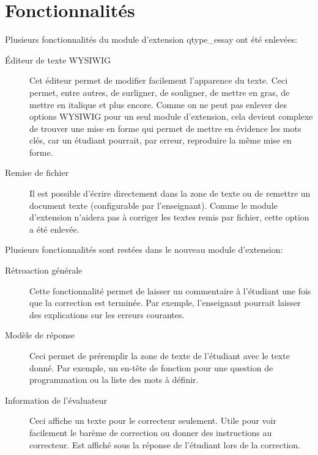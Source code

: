 \section{Fonctionnalités}

Plusieurs fonctionnalités du module d'extension \og qtype\_essay \fg{} ont été enlevées:

\begin{description}
  \item[Éditeur de texte WYSIWIG]
  
  Cet \'editeur permet de modifier facilement l'apparence du texte.
  Ceci permet, entre autres, de surligner, de souligner, de mettre en gras, de mettre en italique et plus encore.
  Comme on ne peut pas enlever des options WYSIWIG pour un seul module d'extension, cela devient complexe de trouver une mise en forme qui permet de mettre en évidence les mots clés, car un étudiant pourrait, par erreur, reproduire la même mise en forme.
  
  \item[Remise de fichier]
  
  Il est possible d'écrire directement dans la zone de texte ou de remettre un document texte (configurable par l'enseignant).
  Comme le module d'extension n'aidera pas à corriger les textes remis par fichier, cette option a été enlevée.
\end{description}

Plusieurs fonctionnalités sont restées dans le nouveau module d'extension:

\begin{description}
  \item[Rétroaction générale]
  
  Cette fonctionnalit\'e permet de laisser un commentaire à l'étudiant une fois que la correction est termin\'ee.
  Par exemple, l'enseignant pourrait laisser des explications sur les erreurs courantes.
  
  \item[Modèle de réponse]
  
  Ceci permet de préremplir la zone de texte de l'étudiant avec le texte donné.
  Par exemple, un en-tête de fonction pour une question de programmation ou la liste des mots à définir.
  
  \item[Information de l'évaluateur]
  
  Ceci affiche un texte pour le correcteur seulement.
  Utile pour voir facilement le barème de correction ou donner des instructions au correcteur.
  Est affiché sous la réponse de l'étudiant lors de la correction.
\end{description}

